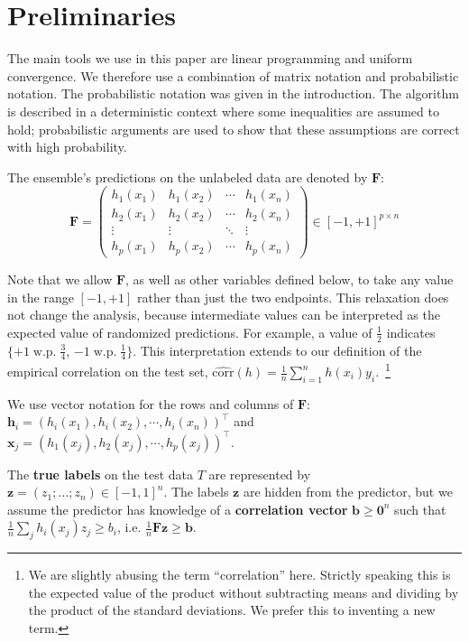 \documentclass{colt2015} %
\newcommand{\corr}{\mbox{corr}}
\newcommand{\vF}{\mathbf{F}}
\newcommand{\vh}{\mathbf{h}}
\newcommand{\vx}{\mathbf{x}}
\newcommand{\vb}{\mathbf{b}}
\newcommand{\vz}{\mathbf{z}}
\newcommand{\vzero}{\mathbf{0}}
\begin{document}
\section{Preliminaries}
\label{sec:setup}

The main tools we use in this paper are linear programming and uniform
convergence. We therefore use a combination of matrix notation and
probabilistic notation. The probabilistic notation was given in
the introduction. The algorithm is described in a deterministic
context where some inequalities are assumed to hold; probabilistic
arguments are used to show that these assumptions are correct with high
probability.

The ensemble's predictions on the unlabeled data are denoted by $\vF$:
\begin{equation}
\vF = 
 \begin{pmatrix}
   h_1(x_1) & h_1(x_2) & \cdots & h_1 (x_n) \\
   h_2(x_1) &  h_2(x_2) & \cdots & h_2 (x_n) \\
   \vdots   & \vdots    & \ddots &  \vdots  \\
   h_p(x_1)  &  h_p (x_2)  & \cdots &  h_p (x_n)
 \end{pmatrix}
 \in [-1, +1]^{p \times n}
\end{equation}

Note that we allow $\vF$, as well as other variables defined below, to
take any value in the range $[-1,+1]$ rather than just the two
endpoints. This relaxation does not change the analysis, because intermediate
values can be interpreted as the expected value of randomized
predictions.  For example, a value of $\frac{1}{2}$ indicates $\{+1\;
\text{w.p.}\; \frac{3}{4} $, $-1\; \text{w.p.}\; \frac{1}{4} \}$. This
interpretation extends to our definition of the empirical correlation
on the test set,
$\hat{\corr}(h) = \frac{1}{n} \sum_{i=1}^n h(x_i)y_i$.~\footnote{We are slightly abusing the
  term ``correlation'' here. Strictly speaking this is the expected
  value of the product without subtracting means and dividing by the
  product of the standard deviations. We prefer this to
  inventing a new term.}

We use vector notation for the rows and columns of $\vF$: 
$\vh_i = (h_i(x_1), h_i(x_2), \cdots, h_i (x_n))^\top$ and \\$\vx_j =
(h_1(x_j), h_2(x_j), \cdots, h_p (x_j))^\top$.

The \textbf{true labels} on the test data $T$ are represented by $\vz
= (z_1; \dots; z_n) \in [-1,1]^n$. The labels $\vz$ are hidden from the predictor, 
but we assume the predictor has knowledge of a {\bf correlation vector}
$\vb \geq \vzero^n$ such that $ \frac{1}{n} \sum_j h_i (x_j) z_j \geq b_i$, 
i.e. $ \frac{1}{n} \vF \vz \geq \vb$. 
\end{document}
